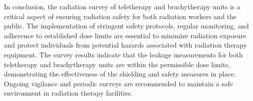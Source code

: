 In conclusion, the radiation survey of teletherapy and brachytherapy units is a critical aspect of ensuring radiation safety for both radiation workers and the public. The implementation of stringent safety protocols, regular monitoring, and adherence to established dose limits are essential to minimize radiation exposure and protect individuals from potential hazards associated with radiation therapy equipment. The survey results indicate that the leakage measurements for both teletherapy and brachytherapy units are within the permissible dose limits, demonstrating the effectiveness of the shielding and safety measures in place. Ongoing vigilance and periodic surveys are recommended to maintain a safe environment in radiation therapy facilities.